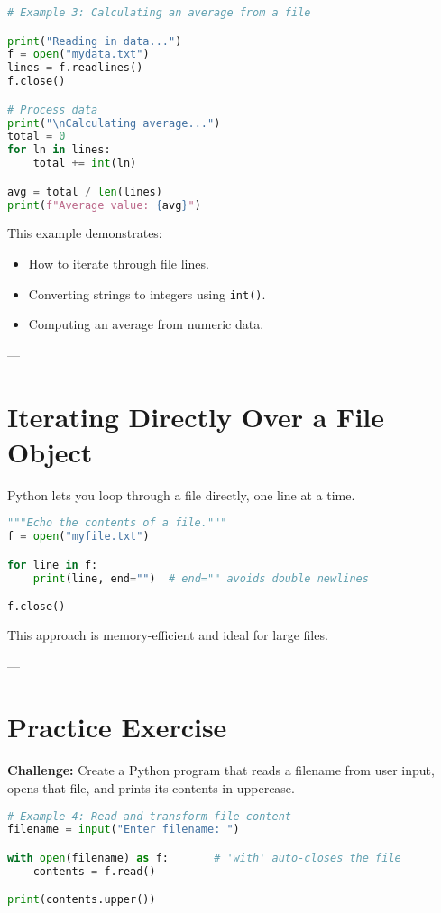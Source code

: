 \begin{lstlisting}[language=Python, caption={Calculating the average value of integers stored in a file.}]
# Example 3: Calculating an average from a file

print("Reading in data...")
f = open("mydata.txt")
lines = f.readlines()
f.close()

# Process data
print("\nCalculating average...")
total = 0
for ln in lines:
    total += int(ln)

avg = total / len(lines)
print(f"Average value: {avg}")
\end{lstlisting}

This example demonstrates:
\begin{itemize}
  \item How to iterate through file lines.
  \item Converting strings to integers using \texttt{int()}.
  \item Computing an average from numeric data.
\end{itemize}

---

\section{Iterating Directly Over a File Object}

Python lets you loop through a file directly, one line at a time.

\begin{lstlisting}[language=Python, caption={Iterating over the lines of a file.}]
"""Echo the contents of a file."""
f = open("myfile.txt")

for line in f:
    print(line, end="")  # end="" avoids double newlines

f.close()
\end{lstlisting}

This approach is memory-efficient and ideal for large files.

---

\section{Practice Exercise}

\textbf{Challenge:}  
Create a Python program that reads a filename from user input, opens that file, and prints its contents in uppercase.

\begin{lstlisting}[language=Python, caption={Challenge Activity: Read and modify file contents.}]
# Example 4: Read and transform file content
filename = input("Enter filename: ")

with open(filename) as f:       # 'with' auto-closes the file
    contents = f.read()

print(contents.upper())
\end{lstlisting}


